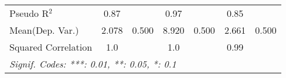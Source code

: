 \begin{tabular}{lcccccc}
   Pseudo R$^2$                                               & 0.87          &      & 0.97           &      & 0.85         & \\  
Mean(Dep. Var.) & 2.078 & 0.500 & 8.920 & 0.500 & 2.661 & 0.500 \\
   Squared Correlation                                        & 1.0           &      & 1.0            &      & 0.99         & \\  
   \midrule \midrule
   \multicolumn{7}{l}{\emph{Signif. Codes: ***: 0.01, **: 0.05, *: 0.1}}\\
\end{tabular}
\par\endgroup
